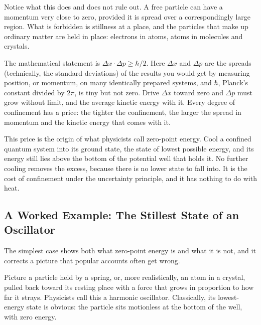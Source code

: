 Notice what this does and does not rule out. A free particle can have a momentum very close to zero, provided it is spread over a correspondingly large region. What is forbidden is stillness at a place, and the particles that make up ordinary matter are held in place: electrons in atoms, atoms in molecules and crystals.

The mathematical statement is $\Delta x \cdot \Delta p \geq \hbar/2$. Here $\Delta x$ and $\Delta p$ are the spreads (technically, the standard deviations) of the results you would get by measuring position, or momentum, on many identically prepared systems, and $\hbar$, Planck's constant divided by $2\pi$, is tiny but not zero. Drive $\Delta x$ toward zero and $\Delta p$ must grow without limit, and the average kinetic energy with it. Every degree of confinement has a price: the tighter the confinement, the larger the spread in momentum and the kinetic energy that comes with it.

This price is the origin of what physicists call zero-point energy. Cool a confined quantum system into its ground state, the state of lowest possible energy, and its energy still lies above the bottom of the potential well that holds it. No further cooling removes the excess, because there is no lower state to fall into. It is the cost of confinement under the uncertainty principle, and it has nothing to do with heat.

\subsection*{A Worked Example: The Stillest State of an Oscillator}

The simplest case shows both what zero-point energy is and what it is not, and it corrects a picture that popular accounts often get wrong.

Picture a particle held by a spring, or, more realistically, an atom in a crystal, pulled back toward its resting place with a force that grows in proportion to how far it strays. Physicists call this a harmonic oscillator. Classically, its lowest-energy state is obvious: the particle sits motionless at the bottom of the well, with zero energy.

